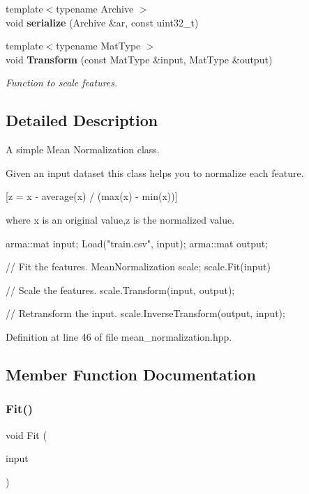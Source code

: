 \begin{DoxyCompactItemize}
{\footnotesize template$<$typename Archive $>$ }\\void \textbf{ serialize} (Archive \&ar, const uint32\+\_\+t)
\item 
{\footnotesize template$<$typename Mat\+Type $>$ }\\void \textbf{ Transform} (const Mat\+Type \&input, Mat\+Type \&output)
\begin{DoxyCompactList}\small\item\em Function to scale features. \end{DoxyCompactList}\end{DoxyCompactItemize}


\subsection{Detailed Description}
A simple Mean Normalization class. 

Given an input dataset this class helps you to normalize each feature.

[z = x -\/ average(x) / (max(x) -\/ min(x))]

where x is an original value,z is the normalized value.


\begin{DoxyCode}
arma::mat input;
Load(\textcolor{stringliteral}{"train.csv"}, input);
arma::mat output;

\textcolor{comment}{// Fit the features.}
MeanNormalization scale;
scale.Fit(input)

\textcolor{comment}{// Scale the features.}
scale.Transform(input, output);

\textcolor{comment}{// Retransform the input.}
scale.InverseTransform(output, input);
\end{DoxyCode}
 

Definition at line 46 of file mean\+\_\+normalization.\+hpp.



\subsection{Member Function Documentation}
\mbox{\label{classmlpack_1_1data_1_1MeanNormalization_a0b68c1a39a21e56e10f5b9250b056244}} 
\subsubsection{Fit()}
{\footnotesize\ttfamily void Fit (\begin{DoxyParamCaption}\item[{const Mat\+Type \&}]{input }\end{DoxyParamCaption})\hspace{0.3cm}{\ttfamily [inline]}}



